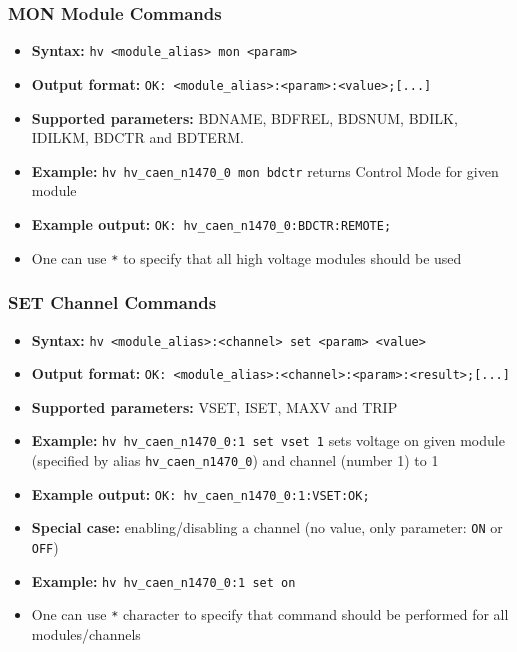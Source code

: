 \subsubsection*{MON Module Commands}
\begin{itemize}
    \item \textbf{Syntax:} \lstinline{hv <module_alias> mon <param>}
    \item \textbf{Output format:} \lstinline{OK: <module_alias>:<param>:<value>;[...]}
    \item \textbf{Supported parameters:} BDNAME, BDFREL, BDSNUM, BDILK, IDILKM, BDCTR and BDTERM.
    \item \textbf{Example:} \lstinline{hv hv_caen_n1470_0 mon bdctr} returns Control Mode for given module
    \item \textbf{Example output:} \lstinline{OK: hv_caen_n1470_0:BDCTR:REMOTE;}
    \item One can use \lstinline{*} to specify that all high voltage modules should be used
\end{itemize}

\dotfill

\subsubsection*{SET Channel Commands}
\begin{itemize}
    \item \textbf{Syntax:} \lstinline{hv <module_alias>:<channel> set <param> <value>}
    \item \textbf{Output format:} \lstinline{OK: <module_alias>:<channel>:<param>:<result>;[...]}
    \item \textbf{Supported parameters:} VSET, ISET, MAXV and TRIP
    \item \textbf{Example:} \lstinline{hv hv_caen_n1470_0:1 set vset 1} sets voltage on given module (specified by alias \lstinline{hv_caen_n1470_0}) and channel (number 1) to 1
    \item \textbf{Example output:} \lstinline{OK: hv_caen_n1470_0:1:VSET:OK;}
    \item \textbf{Special case:} enabling/disabling a channel (no value, only parameter: \lstinline{ON} or \lstinline{OFF})
    \item \textbf{Example:} \lstinline{hv hv_caen_n1470_0:1 set on}
    \item One can use \lstinline{*} character to specify that command should be performed for all modules/channels
\end{itemize}

